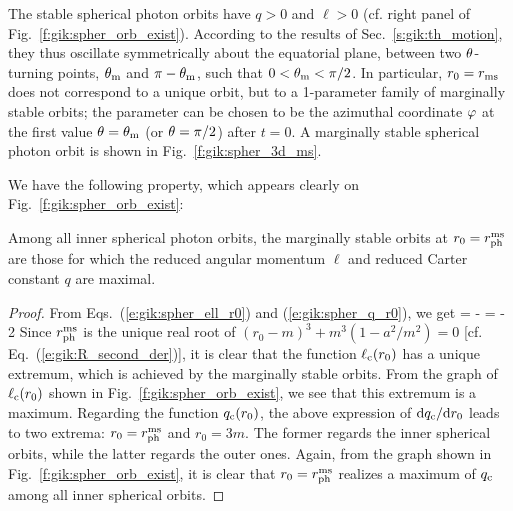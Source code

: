 The stable spherical photon orbits have $q>0$ and $\ell > 0$
(cf. right panel of Fig.~\ref{f:gik:spher_orb_exist}).
According to the results of Sec.~\ref{s:gik:th_motion}, they
thus oscillate symmetrically about the equatorial plane, between
two $\theta$-turning points, $\theta_{\rm m}$ and $\pi-\theta_{\rm m}$, such that $0<\theta_{\rm m}<\pi/2$.
In particular, $r_0 = r_{\rm ms}$ does not correspond to a unique orbit, but
to a 1-parameter family of marginally stable orbits; the parameter can be chosen
to be the azimuthal coordinate $\varphi$ at the first value $\theta=\theta_{\rm m}$ (or $\theta=\pi/2$)
after $t=0$. A marginally stable spherical photon orbit is
shown in Fig.~\ref{f:gik:spher_3d_ms}.

We have the following property, which appears clearly on Fig.~\ref{f:gik:spher_orb_exist}:
\begin{greybox}
Among all inner spherical photon orbits, the marginally stable orbits
at $r_0 = r_{\rm ph}^{\rm ms}$ are those for which the reduced angular momentum $\ell$
and reduced Carter constant $q$ are maximal.
\end{greybox}
\begin{proof}
From Eqs.~(\ref{e:gik:spher_ell_r0}) and (\ref{e:gik:spher_q_r0}), we get
\be \label{e:gik:spher_orb_dqdr}
    = - 
\ee
\be
    = - 2 
\ee
Since $r_{\rm ph}^{\rm ms}$ is the unique real root of
$(r_0 - m)^3 + m^3 (1 - a^2/m^2) = 0$ [cf. Eq.~(\ref{e:gik:R_second_der})],
it is clear that the function $\ell_{\rm c}(r_0)$ has a unique extremum, which is
achieved by the marginally stable orbits. From the graph of $\ell_{\rm c}(r_0)$
shown in Fig.~\ref{f:gik:spher_orb_exist}, we see that this extremum is
a maximum. Regarding the function $q_{\rm c}(r_0)$, the above expression of $\mathrm{d} q_{\rm c}/\mathrm{d} r_0$
leads to two extrema: $r_0 = r_{\rm ph}^{\rm ms}$ and $r_0 = 3 m$.
The former regards the inner spherical orbits, while the latter regards
the outer ones. Again, from the graph shown in Fig.~\ref{f:gik:spher_orb_exist},
it is clear that $r_0 = r_{\rm ph}^{\rm ms}$ realizes a maximum of $q_{\rm c}$
among all inner spherical orbits.
\end{proof}

